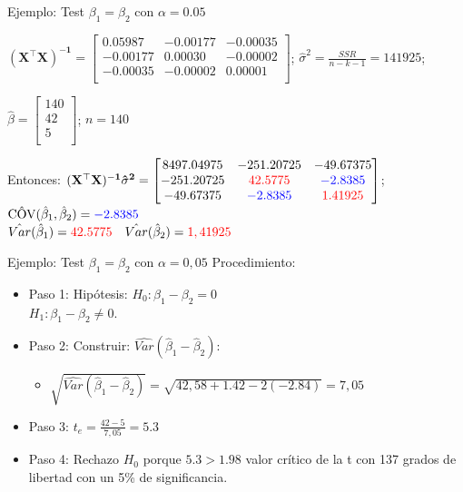 \documentclass{beamer}
\begin{document}
\begin{frame}{Ejemplo: Test $\beta_1 = \beta_2$ con $\alpha = 0.05$}

\vspace{0.5cm}



$\mathbf{(X^{\top}X)^{-1}} =
        \begin{bmatrix}
            0.05987 & -0.00177 & -0.00035 \\
            -0.00177 & 0.00030 & -0.00002 \\
            -0.00035 & -0.00002 & 0.00001 \\
        \end{bmatrix}$; $\hat{\sigma}^2 = \frac{SSR}{n-k-1} = 141925$; 

        $\hat{\beta} =
        \begin{bmatrix}
            140 \\
            42 \\
            5 \\
        \end{bmatrix}$; $n=140$

Entonces: $\mathbf{(X^{\top}X)^{-1}\hat{\sigma}^2} =
        \begin{bmatrix}
            8497.04975 & -251.20725 & -49.67375 \\
            -251.20725 & \textcolor{red}{42.5775} & \textcolor{blue}{-2.8385} \\
            -49.67375 & \textcolor{blue}{-2.8385} & \textcolor{red}{1.41925} \\
        \end{bmatrix}$; $\hat{\text{COV}}(\hat{\beta}_1, \hat{\beta}_2) = \textcolor{blue}{-2.8385}$\\
        $\hat{Var}(\hat{\beta}_1)=\textcolor{red}{42.5775} \quad \hat{Var}(\hat{\beta}_2)=\textcolor{red}{1,41925} $
\end{frame}
\begin{frame}{Ejemplo: Test $\beta_1 = \beta_2$ con $\alpha = 0,05$}
Procedimiento:
        \begin{itemize}
            \item Paso 1: Hipótesis: $H_0: \beta_1 - \beta_2 = 0$\\
            $H_1: \beta_1 - \beta_2 \neq 0$.
            \item Paso 2: Construir: $\hat{Var}(\hat{\beta}_1 - \hat{\beta}_2)$:
            \begin{itemize}
          
                \item $\sqrt{\hat{Var}(\hat{\beta}_1 - \hat{\beta}_2)} = \sqrt{42,58 + 1.42 - 2(-2.84)} = 7,05$
            \end{itemize}
            \item Paso 3: $t_e = \frac{42 - 5}{7,05} = 5.3$
            \item Paso 4: Rechazo $H_0$ porque $5.3 > 1.98$  valor crítico de  la t con 137 grados de libertad  con un 5\% de significancia. 
        \end{itemize}
\end{frame}
\end{document}
